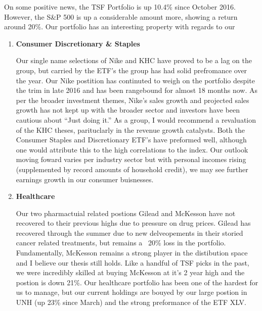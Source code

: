 \documentclass[11pt,pressrelease]{newlfm} %
\begin{document}
\begin{newlfm}


\vspace{-.12 in} 			%
\begin{singlespace} 		%
On some positive news, the TSF Portfolio is up 10.4\% since October 2016. However, the S\&P 500 is up a considerable amount more, showing a return around 20\%. Our portfolio has an interesting property with regards to our

\begin{enumerate}
\item \textbf{Consumer Discretionary \& Staples} \par
Our single name selections of Nike and KHC have proved to be a lag on the group, but carried by the ETF's the group has had solid prefromance over the year.
Our Nike postition has continuted to weigh on the portfolio despite the trim in late 2016 and has been rangebound for almost 18 months now. As per the broader investment themes, Nike's sales growth and projected sales growth has not kept up with the broader sector and investors have been cautious about ``Just doing it.'' As a group, I would recommend a revaluation of the KHC theses, parituclarly in the revenue growth catalysts. Both the Consumer Staples and Discretionary ETF’s have preformed well, although one would attribute this to the high correlations to the index. Our outlook moving foward varies per industry sector but with personal incomes rising (supplemented by record amounts of household credit), we may see further earnings growth in our consumer buisnesses. %


\item \textbf{Healthcare} \par
Our two pharmactuial related postions Gilead and McKesson have not recovered to their previous highs due to pressure on drug prices. Gilead has recovered through the summer due to new delveopements in their storied cancer related treatments, but remains a ~20\% loss in the portfolio. Fundamentally, McKesson remains a strong player in the distibution space and I believe our thesis still holds. Like a handful of TSF picks in the past, we were incredibly skilled at buying McKesson at it's 2 year high and the postion is down 21\%. Our healthcare portfolio has been one of the hardest for us to manage, but our   current holdings are bouyed by our large postion in UNH (up 23\% since March) and the strong preformance of the ETF XLV.


\end{enumerate}
\end{singlespace}
\end{newlfm}
\end{document}
